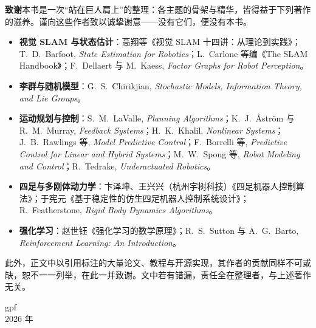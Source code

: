 \vspace{1em}
\noindent\textbf{致谢}\quad 本书是一次“站在巨人肩上”的整理：各主题的骨架与精华，皆得益于下列著作的滋养。谨向这些作者致以诚挚谢意——没有它们，便没有本书。

\begin{itemize}\setlength{\itemsep}{2pt}
  \item \textbf{视觉 SLAM 与状态估计}：高翔等《视觉 SLAM 十四讲：从理论到实践》\cite{gaoxiang2019slam14}；T.~D.~Barfoot, \emph{State Estimation for Robotics}\cite{barfoot2024state}；L.~Carlone 等编《The SLAM Handbook》\cite{carlone2026handbook}；F.~Dellaert 与 M.~Kaess, \emph{Factor Graphs for Robot Perception}\cite{dellaert2017factor}。
  \item \textbf{李群与随机模型}：G.~S.~Chirikjian, \emph{Stochastic Models, Information Theory, and Lie Groups}\cite{chirikjian2011stochastic}。
  \item \textbf{运动规划与控制}：S.~M.~LaValle, \emph{Planning Algorithms}\cite{lavalle2006planning}；K.~J.~{\AA}str{\"o}m 与 R.~M.~Murray, \emph{Feedback Systems}\cite{astrom2008feedback}；H.~K.~Khalil, \emph{Nonlinear Systems}\cite{khalil2002nonlinear}；J.~B.~Rawlings 等, \emph{Model Predictive Control}\cite{rawlings2020mpc}；F.~Borrelli 等, \emph{Predictive Control for Linear and Hybrid Systems}\cite{borrelli2017predictive}；M.~W.~Spong 等, \emph{Robot Modeling and Control}\cite{spong2006robot}；R.~Tedrake, \emph{Underactuated Robotics}\cite{tedrake_underactuated}。
  \item \textbf{四足与多刚体动力学}：卞泽坤、王兴兴（杭州宇树科技）《四足机器人控制算法》\cite{unitree2023quadruped}；于宪元《基于稳定性的仿生四足机器人控制系统设计》\cite{yu2021quadruped}；R.~Featherstone, \emph{Rigid Body Dynamics Algorithms}\cite{featherstone2008rigid}。
  \item \textbf{强化学习}：赵世钰《强化学习的数学原理》\cite{zhao2024rlmath}；R.~S.~Sutton 与 A.~G.~Barto, \emph{Reinforcement Learning: An Introduction}\cite{sutton2018rl}。
\end{itemize}

\noindent 此外，正文中以引用标注的大量论文、教程与开源实现，其作者的贡献同样不可或缺，恕不一一列举，在此一并致谢。文中若有错漏，责任全在整理者，与上述著作无关。

\vspace{1.5em}
\begin{flushright}
  gpf\\[0.3em]
  2026 年
\end{flushright}
